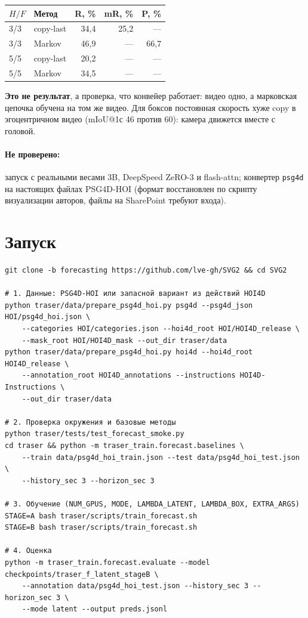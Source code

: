\documentclass[11pt,a4paper]{article}
\newcommand{\code}[1]{\texttt{#1}}
\begin{document}
\begin{center}
\begin{tabular}{@{}llrrr@{}}
\toprule
$H/F$ & Метод & R, \% & mR, \% & P, \% \\
\midrule
3/3 & copy-last & 34,4 & 25,2 & --- \\
3/3 & Markov    & 46,9 & --- & 66,7 \\
5/5 & copy-last & 20,2 & --- & --- \\
5/5 & Markov    & 34,5 & --- & --- \\
\bottomrule
\end{tabular}
\end{center}
\textbf{Это не результат}, а проверка, что конвейер работает: видео одно, а марковская цепочка
обучена на том же видео. Для боксов постоянная скорость хуже copy в эгоцентричном видео
(mIoU@1с 46 против 60): камера движется вместе с головой.

\paragraph{Не проверено:} запуск с реальными весами 3B, DeepSpeed ZeRO-3 и flash-attn;
конвертер \code{psg4d} на настоящих файлах PSG4D-HOI (формат восстановлен по скрипту
визуализации авторов, файлы на SharePoint требуют входа).

\section{Запуск}

\begin{lstlisting}
git clone -b forecasting https://github.com/lve-gh/SVG2 && cd SVG2

# 1. Данные: PSG4D-HOI или запасной вариант из действий HOI4D
python traser/data/prepare_psg4d_hoi.py psg4d --psg4d_json HOI/psg4d_hoi.json \
    --categories HOI/categories.json --hoi4d_root HOI/HOI4D_release \
    --mask_root HOI/HOI4D_mask --out_dir traser/data
python traser/data/prepare_psg4d_hoi.py hoi4d --hoi4d_root HOI4D_release \
    --annotation_root HOI4D_annotations --instructions HOI4D-Instructions \
    --out_dir traser/data

# 2. Проверка окружения и базовые методы
python traser/tests/test_forecast_smoke.py
cd traser && python -m traser_train.forecast.baselines \
    --train data/psg4d_hoi_train.json --test data/psg4d_hoi_test.json \
    --history_sec 3 --horizon_sec 3

# 3. Обучение (NUM_GPUS, MODE, LAMBDA_LATENT, LAMBDA_BOX, EXTRA_ARGS)
STAGE=A bash traser/scripts/train_forecast.sh
STAGE=B bash traser/scripts/train_forecast.sh

# 4. Оценка
python -m traser_train.forecast.evaluate --model checkpoints/traser_f_latent_stageB \
    --annotation data/psg4d_hoi_test.json --history_sec 3 --horizon_sec 3 \
    --mode latent --output preds.jsonl
\end{lstlisting}
\end{document}
